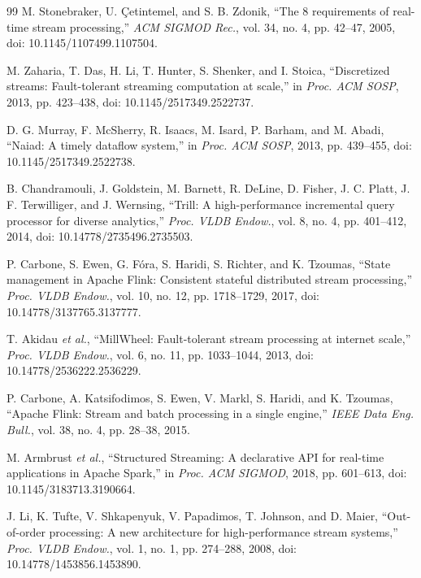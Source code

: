 \documentclass[conference]{IEEEtran}
\begin{document}
\begin{thebibliography}{99}
M. Stonebraker, U. {\c{C}}etintemel, and S. B. Zdonik, ``The 8 requirements of real-time stream processing,'' \emph{ACM SIGMOD Rec.}, vol. 34, no. 4, pp. 42--47, 2005, doi: 10.1145/1107499.1107504.

M. Zaharia, T. Das, H. Li, T. Hunter, S. Shenker, and I. Stoica,
``Discretized streams: Fault-tolerant streaming computation at scale,'' in \emph{Proc. ACM SOSP}, 2013, pp. 423--438, doi: 10.1145/2517349.2522737.

D. G. Murray, F. McSherry, R. Isaacs, M. Isard, P. Barham, and M. Abadi,
``Naiad: A timely dataflow system,'' in \emph{Proc. ACM SOSP}, 2013, pp. 439--455, doi: 10.1145/2517349.2522738.

B. Chandramouli, J. Goldstein, M. Barnett, R. DeLine, D. Fisher, J. C. Platt, J. F. Terwilliger, and J. Wernsing,
``Trill: A high-performance incremental query processor for diverse analytics,'' \emph{Proc. VLDB Endow.}, vol. 8, no. 4, pp. 401--412, 2014, doi: 10.14778/2735496.2735503.

P. Carbone, S. Ewen, G. F\'ora, S. Haridi, S. Richter, and K. Tzoumas,
``State management in Apache Flink: Consistent stateful distributed stream processing,'' \emph{Proc. VLDB Endow.}, vol. 10, no. 12, pp. 1718--1729, 2017, doi: 10.14778/3137765.3137777.

T. Akidau \emph{et al.}, ``MillWheel: Fault-tolerant stream processing at internet scale,'' \emph{Proc. VLDB Endow.}, vol. 6, no. 11, pp. 1033--1044, 2013, doi: 10.14778/2536222.2536229.

P. Carbone, A. Katsifodimos, S. Ewen, V. Markl, S. Haridi, and K. Tzoumas, ``Apache Flink: Stream and batch processing in a single engine,'' \emph{IEEE Data Eng. Bull.}, vol. 38, no. 4, pp. 28--38, 2015.

M. Armbrust \emph{et al.}, ``Structured Streaming: A declarative API for real-time applications in Apache Spark,'' in \emph{Proc. ACM SIGMOD}, 2018, pp. 601--613, doi: 10.1145/3183713.3190664.

J. Li, K. Tufte, V. Shkapenyuk, V. Papadimos, T. Johnson, and D. Maier,
``Out-of-order processing: A new architecture for high-performance stream systems,'' \emph{Proc. VLDB Endow.}, vol. 1, no. 1, pp. 274--288, 2008, doi: 10.14778/1453856.1453890.


\end{thebibliography}
\end{document}
